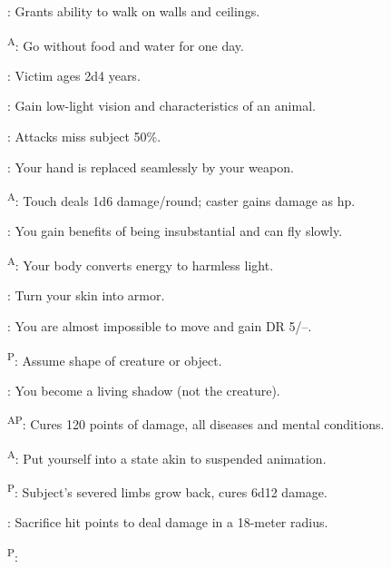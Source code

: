 \begin{enumerate*}
      : Grants ability to walk on walls and ceilings.

      \textsuperscript{A}: Go without food and water for one day. %

\item {}: Victim ages 2d4 years.

      : Gain low-light vision and characteristics of an animal.

      : Attacks miss subject 50\%.

      : Your hand is replaced seamlessly by your weapon. %

      \textsuperscript{A}: Touch deals 1d6 damage/round; caster gains damage as hp.

\item {}: You gain benefits of being insubstantial and can fly slowly. %

      \textsuperscript{A}: Your body converts energy to harmless light.

      : Turn your skin into armor.

\item {}: You are almost impossible to move and gain DR 5/--.

      \textsuperscript{P}: Assume shape of creature or object. %

      : You become a living shadow (not the creature). %

\item {}\textsuperscript{AP}: Cures 120 points of damage, all diseases and mental conditions.

      \textsuperscript{A}: Put yourself into a state akin to suspended animation. %

\item {}\textsuperscript{P}: Subject's severed limbs grow back, cures 6d12 damage.

\item {}: Sacrifice hit points to deal damage in a 18-meter radius.

\item {}\textsuperscript{P}:
\end{enumerate*}



